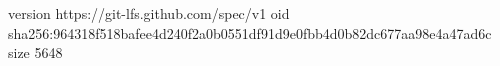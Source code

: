 version https://git-lfs.github.com/spec/v1
oid sha256:964318f518bafee4d240f2a0b0551df91d9e0fbb4d0b82dc677aa98e4a47ad6c
size 5648
